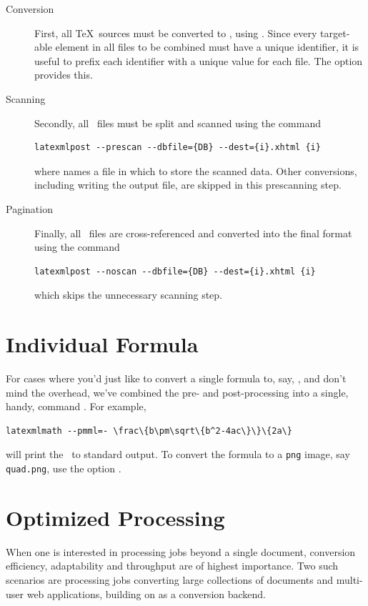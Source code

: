 \documentclass{book}
\begin{document}
\begin{description}
\item[Conversion] First, all \TeX\ sources must be converted
   to \XML, using .  Since every target-able element
   in all files to be combined must have a unique identifier, it is useful to
   prefix each identifier with a unique value for each file. 
   The  option  provides this.

 \item[Scanning] Secondly, all \XML\ files must be split and scanned using
  the command
  \begin{lstlisting}[style=shell]
   latexmlpost --prescan --dbfile={DB} --dest={i}.xhtml {i}
  \end{lstlisting}
  where  names a file in which to store the scanned data.
  Other conversions, including writing the output file, are skipped in this prescanning step.
 
 \item[Pagination] Finally, all \XML\ files are cross-referenced and converted into
   the final format using the command
   \begin{lstlisting}[style=shell]
     latexmlpost --noscan --dbfile={DB} --dest={i}.xhtml {i}
   \end{lstlisting}
   which skips the unnecessary scanning step.
\end{description}

\section{Individual Formula}\label{usage.latexmlmath}
For cases where you'd just like to convert a single formula to, say, \MathML,
and don't mind the overhead, we've combined the pre- and post-processing into
a single, handy, command .  For example,
\begin{lstlisting}[style=shell]
  latexmlmath --pmml=- \frac\{b\pm\sqrt\{b^2-4ac\}\}\{2a\}
\end{lstlisting}
will print the \MathML\ to standard output.  
To convert the formula to a \texttt{png} image, say \texttt{quad.png},
use the option .
\section{Optimized Processing}\label{usage.daemon}
When one is interested in processing jobs beyond a single document,
conversion efficiency, adaptability and throughput are of highest importance. Two such scenarios are processing jobs converting large
collections of documents and multi-user web applications,
building on {\LaTeXML} as a conversion backend.
\end{document}
